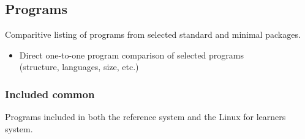 \subsection{Programs}\label{Programs}

Comparitive listing of programs from selected standard and minimal packages.

\begin{itemize}
    \item Direct one-to-one program comparison of selected programs \\(structure, languages, size, etc.)
\end{itemize}

\newpage

\subsubsection{Included common}

Programs included in both the reference system and the Linux for learners system.

